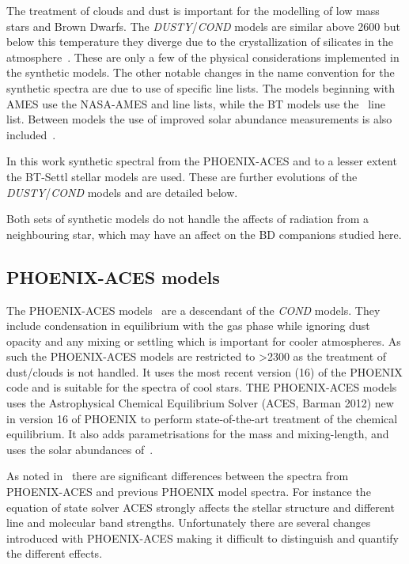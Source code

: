 The treatment of clouds and dust is important for the modelling of low mass stars and Brown Dwarfs.
The \emph{DUSTY}/\emph{COND} models are similar above 2600\K{} but below this temperature they diverge due to the crystallization of silicates in the atmosphere~\citep{allard_limiting_2001}.
These are only a few of the physical considerations implemented in the synthetic models.
The other notable changes in the name convention for the synthetic spectra are due to use of specific line lists.
The models beginning with {AMES} use the {NASA-AMES}  and  line lists, while the {BT} models use the~\citet{barber_highaccuracy_2006}  line list.
Between models the use of improved solar abundance measurements is also included~\citep[][]{asplund_chemical_2009}.

In this work synthetic spectral from the {PHOENIX-ACES} and to a lesser extent the {BT-Settl} stellar models are used.
These are further evolutions of the \emph{DUSTY}/\emph{COND} models and are detailed below.

Both sets of synthetic models do not handle the affects of radiation from a neighbouring star, which may have an affect on the {BD} companions studied here.

\subsection{{PHOENIX-ACES} models}
\label{subsec:phoenix_aces}

The {PHOENIX-ACES} models~\citep{husser_new_2013} are a descendant of the \emph{COND} models.
They include condensation in equilibrium with the gas phase while ignoring dust opacity and any mixing or settling which is important for cooler atmospheres.
As such the {PHOENIX-ACES} models are restricted to \Teff{}>2300\K{} as the treatment of dust/clouds is not handled.
It uses the most recent version (16) of the {PHOENIX} code and is suitable for the spectra of cool stars.
THE {PHOENIX-ACES} models uses the Astrophysical Chemical Equilibrium Solver (ACES, Barman 2012) new in version 16 of {PHOENIX} to perform state-of-the-art treatment of the chemical equilibrium.
It also adds parametrisations for the mass and mixing-length, and uses the solar abundances of~\citet{asplund_chemical_2009}.

As noted in~\citep{husser_new_2013} there are significant differences between the spectra from {PHOENIX-ACES} and previous {PHOENIX} model spectra.
For instance the equation of state solver ACES strongly affects the stellar structure and different line and molecular band strengths.
Unfortunately there are several changes introduced with {PHOENIX-ACES} making it difficult to distinguish and quantify the different effects.

